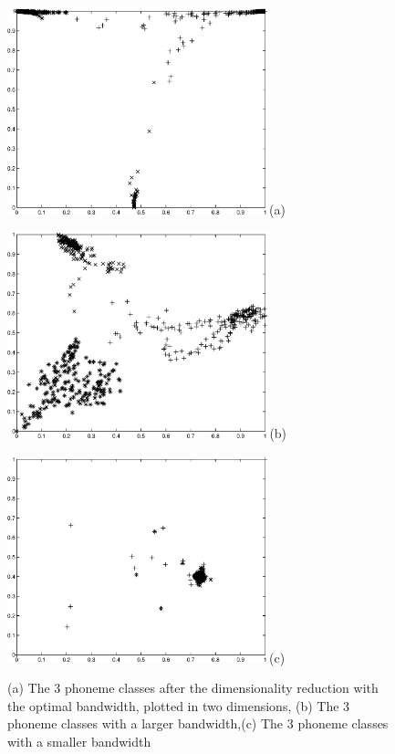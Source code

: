 \documentclass[12pt,letterpaper,doublespaced,ETD,dvips,proposal]{gtthesis}
\begin{document}
\begin{Body}
\begin{figure}[!htb]
 \centerline{\includegraphics[height=6cm]{fig4a.eps}(a)}
 \centerline{\includegraphics[height=6cm]{fig4c.eps}(b)}
\centerline{\includegraphics[height=6cm]{fig4e.eps}(c)}
 \caption{(a) The 3 phoneme classes after the dimensionality reduction
with the optimal bandwidth, plotted in two dimensions, (b) The 3
phoneme classes with a larger bandwidth,(c) The 3 phoneme classes
with a smaller bandwidth}
  \label{fig4}
\end{figure}



\end{Body}
\end{document}
